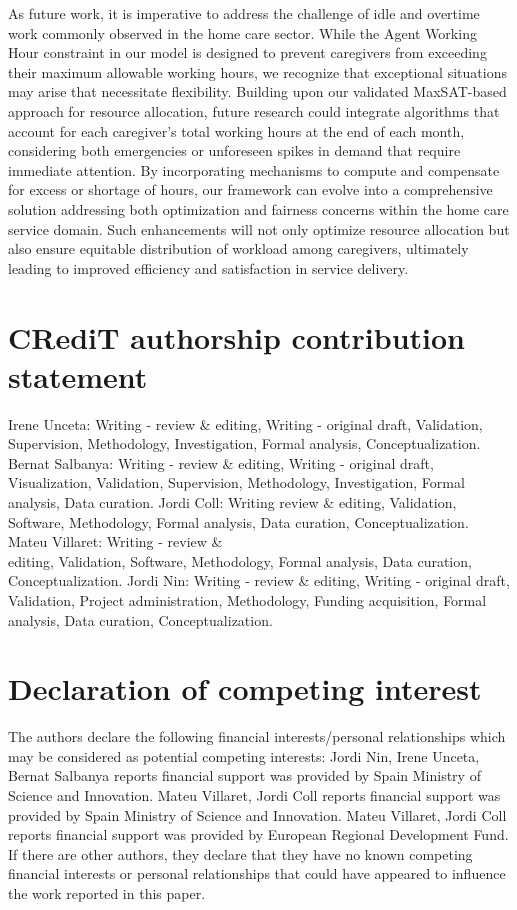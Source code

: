 \documentclass[10pt]{article}
\begin{document}
As future work, it is imperative to address the challenge of idle and overtime work commonly observed in the home care sector. While the Agent Working Hour constraint in our model is designed to prevent caregivers from exceeding their maximum allowable working hours, we recognize that exceptional situations may arise that necessitate flexibility. Building upon our validated MaxSAT-based approach for resource allocation, future research could integrate algorithms that account for each caregiver's total working hours at the end of each month, considering both emergencies or unforeseen spikes in demand that require immediate attention. By incorporating mechanisms to compute and compensate for excess or shortage of hours, our framework can evolve into a comprehensive solution addressing both optimization and fairness concerns within the home care service domain. Such enhancements will not only optimize resource allocation but also ensure equitable distribution of workload among caregivers, ultimately leading to improved efficiency and satisfaction in service delivery.

\section*{CRediT authorship contribution statement}
Irene Unceta: Writing - review \& editing, Writing - original draft, Validation, Supervision, Methodology, Investigation, Formal analysis, Conceptualization. Bernat Salbanya: Writing - review \& editing, Writing - original draft, Visualization, Validation, Supervision, Methodology, Investigation, Formal analysis, Data curation. Jordi Coll: Writing review \& editing, Validation, Software, Methodology, Formal analysis, Data curation, Conceptualization. Mateu Villaret: Writing - review \&\\
editing, Validation, Software, Methodology, Formal analysis, Data curation, Conceptualization. Jordi Nin: Writing - review \& editing, Writing - original draft, Validation, Project administration, Methodology, Funding acquisition, Formal analysis, Data curation, Conceptualization.

\section*{Declaration of competing interest}
The authors declare the following financial interests/personal relationships which may be considered as potential competing interests: Jordi Nin, Irene Unceta, Bernat Salbanya reports financial support was provided by Spain Ministry of Science and Innovation. Mateu Villaret, Jordi Coll reports financial support was provided by Spain Ministry of Science and Innovation. Mateu Villaret, Jordi Coll reports financial support was provided by European Regional Development Fund. If there are other authors, they declare that they have no known competing financial interests or personal relationships that could have appeared to influence the work reported in this paper.
\end{document}
